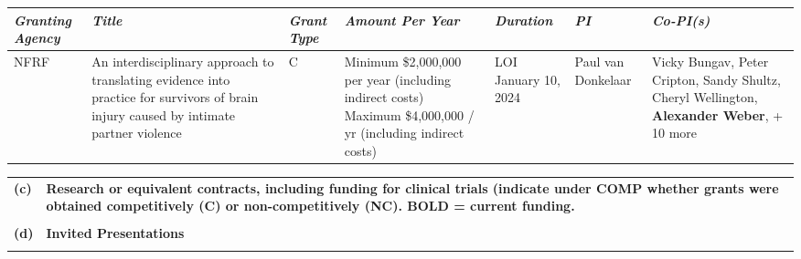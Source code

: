 \documentclass[11pt,notitlepage,english]{report}
\begin{document}
\begin{longtable}{|L{2cm}|L{3.6cm}|L{1cm}|L{2cm}|L{1.7cm}|L{2cm}|L{2cm}|}
  \hline
  \textit{\textbf{Granting Agency}} & \textit{\textbf{Title}} & \textit{\textbf{Grant Type}} & \textit{\textbf{Amount Per Year}} & \textit{\textbf{Duration}} & \textit{\textbf{PI}} & \textit{\textbf{Co-PI(s)}} \\
  \hline
  NFRF & An interdisciplinary approach to translating evidence into practice for survivors of brain injury caused by intimate partner violence & C & Minimum \$2,000,000 per year (including indirect costs) \newline Maximum \$4,000,000 / yr (including indirect costs) & LOI January 10, 2024 & Paul van Donkelaar & Vicky Bungav, Peter Cripton, Sandy Shultz, Cheryl Wellington, \textbf{Alexander Weber}, + 10 more \\
  \hline
\end{longtable}

\begin{tabular}{L{.5cm} L{15.6cm}}
  \\
  \textbf{(c)} & \textbf{Research or equivalent contracts, including funding for clinical trials (indicate under COMP whether grants were obtained competitively (C) or non-competitively (NC). BOLD = current funding.} \\
  \\
  \textbf{(d)} & \textbf{Invited Presentations} \\
  \\
\end{tabular}
\end{document}

